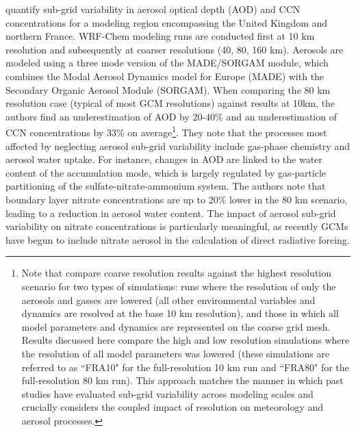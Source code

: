 \cite{weigum_effect_2016} quantify sub-grid variability in aerosol optical depth (AOD) and CCN concentrations for a modeling region encompassing the United Kingdom and northern France. WRF-Chem modeling runs are conducted first at 10 km resolution and subsequently at coarser resolutions (40, 80, 160 km). Aerosols are modeled using a three mode version of the MADE/SORGAM module, which combines the Modal Aerosol Dynamics model for Europe (MADE) with the Secondary Organic Aerosol Module (SORGAM). When comparing the 80 km resolution case (typical of most GCM resolutions) against results at 10km, the authors find an underestimation of AOD by 20-40\% and an underestimation of CCN concentrations by 33\% on average\footnote{Note that \cite{weigum_effect_2016} compare coarse resolution results against the highest resolution scenario for two types of simulations: runs where the resolution of only the aerosols and gasses are lowered (all other environmental variables and dynamics are resolved at the base 10 km resolution), and those in which all model parameters and dynamics are represented on the coarse grid mesh. Results discussed here compare the high and low resolution simulations where the resolution of all model parameters was lowered (these simulations are referred to as ``FRA10" for the full-resolution 10 km run and ``FRA80" for the full-resolution 80 km run). This approach matches the manner in which past studies have evaluated sub-grid variability across modeling scales and crucially considers the coupled impact of resolution on meteorology and aerosol processes.}. They note that the processes most affected by neglecting aerosol sub-grid variability include gas-phase chemistry and aerosol water uptake. For instance, changes in AOD are linked to the water content of the accumulation mode, which is largely regulated by gas-particle partitioning of the sulfate-nitrate-ammonium system. The authors note that boundary layer nitrate concentrations are up to 20\% lower in the 80 km scenario, leading to a reduction in aerosol water content. The impact of aerosol sub-grid variability on nitrate concentrations is particularly meaningful, as recently GCMs have begun to include nitrate aerosol in the calculation of direct radiative forcing.

